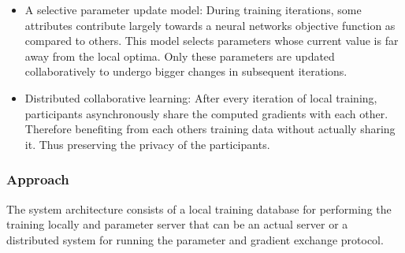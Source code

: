 \begin{itemize}
	\item A selective parameter update model: During training iterations, some attributes contribute largely
	towards a neural networks objective function as compared to others. This model selects parameters whose
	current value is far away from the local optima. Only these parameters are updated collaboratively to 
	undergo bigger changes in subsequent iterations. 
	
	\item Distributed collaborative learning: After every iteration of local training, participants
	asynchronously share the computed gradients with each other. Therefore benefiting from each others
	training data without actually sharing it. Thus preserving the privacy of the participants.  
	
\end{itemize}

\subsubsection*{Approach}

The system architecture consists of a local training database for performing the training locally
and parameter server that can be an actual server or a distributed system for running the parameter 
and gradient exchange protocol. 

